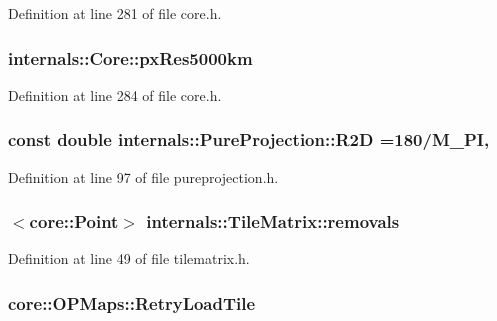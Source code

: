 Definition at line 281 of file core.\-h.

\hypertarget{group___o_p_map_widget_gaed5c41c8c2b585074948d5918ae1a480}{
\subsubsection[{px\-Res5000km}]{ internals\-::\-Core\-::px\-Res5000km\hspace{0.3cm}{\ttfamily [protected]}}}\label{group___o_p_map_widget_gaed5c41c8c2b585074948d5918ae1a480}


Definition at line 284 of file core.\-h.

\hypertarget{group___o_p_map_widget_ga112e42b7b86260ce042d7c14b4ece2b7}{
\subsubsection[{R2\-D}]{\setlength{\rightskip}{0pt plus 5cm}const {\bf double} internals\-::\-Pure\-Projection\-::\-R2\-D =180/M\-\_\-\-P\-I\hspace{0.3cm}{\ttfamily [static]}, {\ttfamily [protected]}}}\label{group___o_p_map_widget_ga112e42b7b86260ce042d7c14b4ece2b7}


Definition at line 97 of file pureprojection.\-h.

\hypertarget{group___o_p_map_widget_gaba9b5e3cf2e51b2a87c5a343968573e9}{
\subsubsection[{removals}]{$<${\bf core\-::\-Point}$>$ internals\-::\-Tile\-Matrix\-::removals\hspace{0.3cm}{\ttfamily [protected]}}}\label{group___o_p_map_widget_gaba9b5e3cf2e51b2a87c5a343968573e9}


Definition at line 49 of file tilematrix.\-h.

\hypertarget{group___o_p_map_widget_ga21cb35ff34ca1e5eccfe7a0c8f054933}{
\subsubsection[{Retry\-Load\-Tile}]{ core\-::\-O\-P\-Maps\-::\-Retry\-Load\-Tile}}\label{group___o_p_map_widget_ga21cb35ff34ca1e5eccfe7a0c8f054933}


